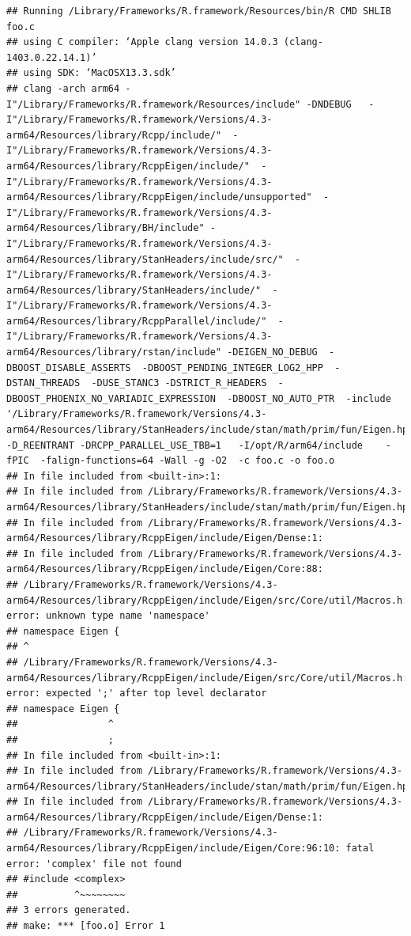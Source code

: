 \documentclass[
]{article}
\begin{document}
\begin{verbatim}
## Running /Library/Frameworks/R.framework/Resources/bin/R CMD SHLIB foo.c
## using C compiler: ‘Apple clang version 14.0.3 (clang-1403.0.22.14.1)’
## using SDK: ‘MacOSX13.3.sdk’
## clang -arch arm64 -I"/Library/Frameworks/R.framework/Resources/include" -DNDEBUG   -I"/Library/Frameworks/R.framework/Versions/4.3-arm64/Resources/library/Rcpp/include/"  -I"/Library/Frameworks/R.framework/Versions/4.3-arm64/Resources/library/RcppEigen/include/"  -I"/Library/Frameworks/R.framework/Versions/4.3-arm64/Resources/library/RcppEigen/include/unsupported"  -I"/Library/Frameworks/R.framework/Versions/4.3-arm64/Resources/library/BH/include" -I"/Library/Frameworks/R.framework/Versions/4.3-arm64/Resources/library/StanHeaders/include/src/"  -I"/Library/Frameworks/R.framework/Versions/4.3-arm64/Resources/library/StanHeaders/include/"  -I"/Library/Frameworks/R.framework/Versions/4.3-arm64/Resources/library/RcppParallel/include/"  -I"/Library/Frameworks/R.framework/Versions/4.3-arm64/Resources/library/rstan/include" -DEIGEN_NO_DEBUG  -DBOOST_DISABLE_ASSERTS  -DBOOST_PENDING_INTEGER_LOG2_HPP  -DSTAN_THREADS  -DUSE_STANC3 -DSTRICT_R_HEADERS  -DBOOST_PHOENIX_NO_VARIADIC_EXPRESSION  -DBOOST_NO_AUTO_PTR  -include '/Library/Frameworks/R.framework/Versions/4.3-arm64/Resources/library/StanHeaders/include/stan/math/prim/fun/Eigen.hpp'  -D_REENTRANT -DRCPP_PARALLEL_USE_TBB=1   -I/opt/R/arm64/include    -fPIC  -falign-functions=64 -Wall -g -O2  -c foo.c -o foo.o
## In file included from <built-in>:1:
## In file included from /Library/Frameworks/R.framework/Versions/4.3-arm64/Resources/library/StanHeaders/include/stan/math/prim/fun/Eigen.hpp:22:
## In file included from /Library/Frameworks/R.framework/Versions/4.3-arm64/Resources/library/RcppEigen/include/Eigen/Dense:1:
## In file included from /Library/Frameworks/R.framework/Versions/4.3-arm64/Resources/library/RcppEigen/include/Eigen/Core:88:
## /Library/Frameworks/R.framework/Versions/4.3-arm64/Resources/library/RcppEigen/include/Eigen/src/Core/util/Macros.h:628:1: error: unknown type name 'namespace'
## namespace Eigen {
## ^
## /Library/Frameworks/R.framework/Versions/4.3-arm64/Resources/library/RcppEigen/include/Eigen/src/Core/util/Macros.h:628:16: error: expected ';' after top level declarator
## namespace Eigen {
##                ^
##                ;
## In file included from <built-in>:1:
## In file included from /Library/Frameworks/R.framework/Versions/4.3-arm64/Resources/library/StanHeaders/include/stan/math/prim/fun/Eigen.hpp:22:
## In file included from /Library/Frameworks/R.framework/Versions/4.3-arm64/Resources/library/RcppEigen/include/Eigen/Dense:1:
## /Library/Frameworks/R.framework/Versions/4.3-arm64/Resources/library/RcppEigen/include/Eigen/Core:96:10: fatal error: 'complex' file not found
## #include <complex>
##          ^~~~~~~~~
## 3 errors generated.
## make: *** [foo.o] Error 1
\end{verbatim}
\end{document}
